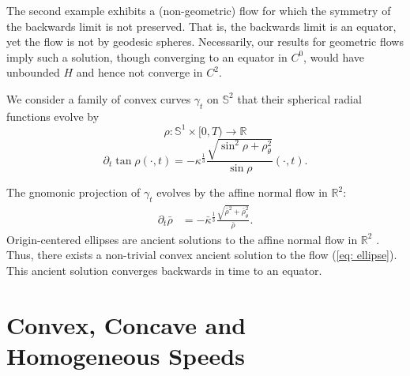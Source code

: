 \documentclass{amsart}
\begin{document}
The second example exhibits a (non-geometric) flow for which the symmetry of the backwards limit is not preserved. That is, the backwards limit is an equator, yet the flow is not by geodesic spheres. Necessarily, our results for geometric flows imply such a solution, though converging to an equator in \(C^0\), would have unbounded \(H\) and hence not converge in \(C^2\).

\begin{example}
We consider a family of convex curves $\gamma_t$ on $\mathbb{S}^2$ that their spherical radial functions evolve by
\[\rho:\mathbb{S}^1\times[0,T)\to \mathbb{R}\]
\begin{equation}\label{eq: ellipse}
\partial_t\tan\rho(\cdot,t)=-\kappa^{\frac{1}{3}} \frac{\sqrt{\sin^2\rho+\rho_{\theta}^2}}{\sin\rho}(\cdot,t).
\end{equation}

The gnomonic projection of $\gamma_t$ evolves by the affine normal flow in $\mathbb{R}^2:$ 
\begin{align*}
\partial_t\bar{\rho}&=-\bar{\kappa}^{\frac{1}{3}}\frac{\sqrt{\bar{\rho}^2+\bar{\rho}_{\theta}^2}}{\bar{\rho}}.
\end{align*}
Origin-centered ellipses are ancient solutions to the affine normal flow in $\mathbb{R}^2$ \cite{Ivaki:2016}. Thus, there exists a non-trivial convex ancient solution to the flow (\ref{eq: ellipse}). This ancient solution converges backwards in time to an equator.
\end{example}

\section{Convex, Concave and Homogeneous Speeds}\label{sec:concave_convex_homogeneous}
\end{document}
